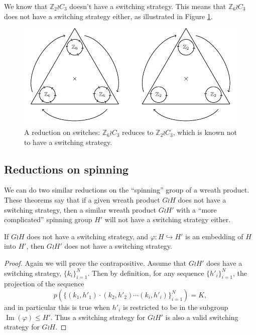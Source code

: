 \begin{example}
  We know that $\mathbb Z_2 \wr C_3$ doesn't have a switching strategy.
  This means that $\mathbb Z_6 \wr C_3$ does not have a switching strategy either,
  as illustrated in Figure \ref{fig:Z2C3}.
  \begin{figure}
    \center
    \includegraphics{assets/tikz_Z2C3.pdf}
    \caption[A reduction from a six-way switch to a two-way switch]{
      A reduction on switches:
      $\mathbb Z_6 \wr C_3$ reduces to $\mathbb Z_2 \wr C_3$,
      which is known not to have a switching strategy.
    }
    \label{fig:Z2C3}
  \end{figure}
\end{example}
\subsection{Reductions on spinning}
We can do two similar reductions on the ``spinning'' group of a wreath product.
These theorems say that if a given wreath product $G \wr H$ does not have a
switching strategy, then a similar wreath product $G \wr H'$ with a
``more complicated'' spinning group $H'$ will not have a switching strategy
either.
\begin{theorem}
  If $G \wr H$ does not have a switching strategy,
  and $\varphi \colon H \hookrightarrow H'$ is an embedding of $H$ into $H'$,
  then $G \wr H'$ does not have a switching strategy.
  \label{thm:SpinReduction}
\end{theorem}
\begin{proof}
  Again we will prove the contrapositive.
  Assume that $G \wr H'$ does have a switching strategy,
  $\{k_i\}_{i=1}^N$. Then by definition, for any sequence
  $\{h'_i\}_{i=1}^N$, the projection of the sequence \begin{equation}
    p(\{(k_1, h'_1)\cdot(k_2, h'_2)\cdots(k_i, h'_i)\}_{i=1}^N) = K,
  \end{equation} and in particular this is true when $h'_i$ is restricted to be
  in the subgroup $\operatorname{Im}(\varphi) \leq H'$.
  Thus a switching strategy for $G \wr H'$ is also a valid switching strategy
  for $G \wr H$.
\end{proof}

